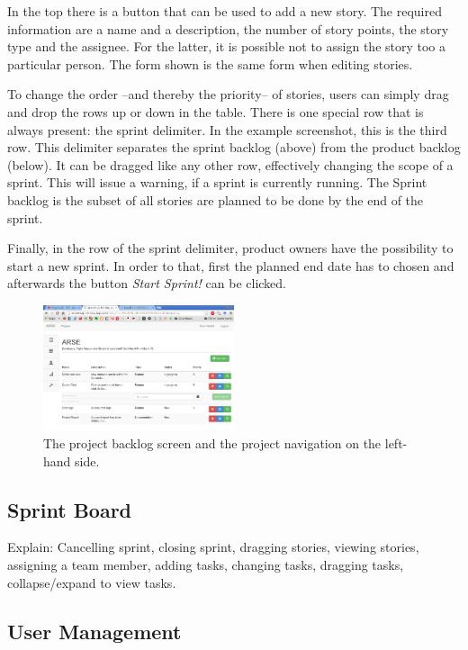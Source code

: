 \documentclass[
	accentcolor=tud1a %
]{tudreport}
\begin{document}
In the top there is a button that can be used to add a new story. The required information are a name and a description, the number of story points, the story type and the assignee. For the latter, it is possible not to assign the story too a particular person. The form shown is the same form when editing stories.

To change the order --and thereby the priority-- of stories, users can simply drag and drop the rows up or down in the table. There is one special row that is always present: the sprint delimiter. In the example screenshot, this is the third row. This delimiter separates the sprint backlog (above) from the product backlog (below). It can be dragged like any other row, effectively changing the scope of a sprint. This will issue a warning, if a sprint is currently running. The Sprint backlog is the subset of all stories are planned to be done by the end of the sprint.

Finally, in the row of the sprint delimiter, product owners have the possibility to start a new sprint. In order to that, first the planned end date has to chosen and afterwards the button \emph{Start Sprint!} can be clicked.

\begin{figure}[ht]
	\centering
	\includegraphics[width=0.5\textwidth]{img/backlog}
	\caption{The project backlog screen and the project navigation on the left-hand side.}
	\label{fig:project-backlog}
\end{figure}

\subsection{Sprint Board}
\label{sec:sprint-board}

Explain: Cancelling sprint, closing sprint, dragging stories, viewing stories, assigning a team member, adding tasks, changing tasks, dragging tasks, collapse/expand to view tasks.

\subsection{User Management}
\label{sec:user-mgmt}
\end{document}
